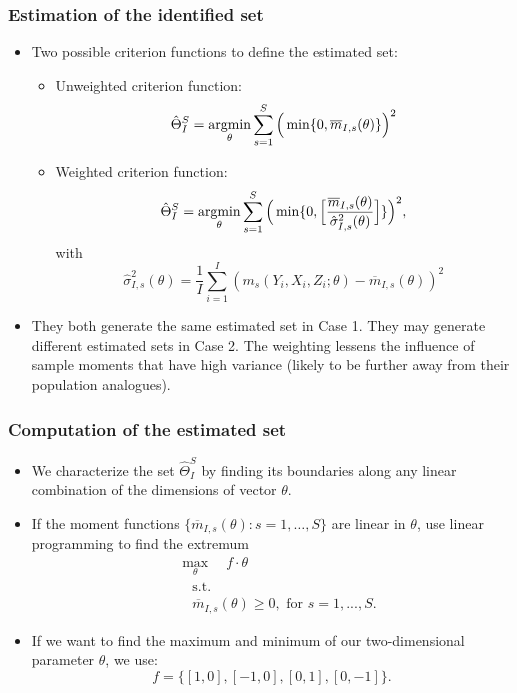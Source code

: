 \documentclass[10pt,letterpaper]{beamer}
\newcommand{\argmin}{\operatornamewithlimits{argmin}}
\begin{document}
\begin{frame}
\frametitle{Estimation of the identified set}

\begin{itemize}
	\item Two possible criterion functions to define the estimated set:
	\begin{itemize}
		\item Unweighted criterion function:
		\begin{equation*}
		\hat{\Theta}^{S}_{I} = \argmin_{\theta}\sum_{s=1}^{S}\Big(\min\{0,\overline{m}_{I,s}(\theta)\}\Big)^{2}
		\end{equation*}
		\item Weighted criterion function:
		\begin{equation*}
		\hat{\Theta}^{S}_{I} = \argmin_{\theta}\sum_{s=1}^{S}\Big(\min\{0,\Big[\frac{\overline{m}_{I,s}(\theta)}{\hat{\sigma}^{2}_{I,s}(\theta)}\Big]\}\Big)^{2},
		\end{equation*}
		with
		\begin{equation*}
		\hat{\sigma}^{2}_{I,s}(\theta)=\frac{1}{I}\sum_{i=1}^{I}(m_{s}(Y_{i},X_{i},Z_{i};\theta)-\overline{m}_{I,s}(\theta))^{2}
		\end{equation*}
	\end{itemize}
	\item They both generate the same estimated set in Case 1. They may generate different estimated sets in Case 2. The weighting lessens the influence of sample moments that have high variance (likely to be further away from their population analogues).
\end{itemize}
\end{frame}
\begin{frame}
\frametitle{Computation of the estimated set}

\begin{itemize}
	\item We characterize the set $\hat{\Theta}^{S}_{I}$ by finding its boundaries along any linear combination of the dimensions of vector $\theta$.
	 \item If the moment functions $\{\overline{m}_{I,s}(\theta ): s=1,\dots,S\}$ are linear in $\theta$, use linear programming to find the extremum 
	\begin{equation}
	\begin{split}
	& \max_{\theta}\quad f\cdot \theta \\
	& \quad \text{s.t.} \\
	& \quad \overline{m}_{I,s}(\theta )\geq 0,\text{ for }s=1,...,S.
	\label{eq: optvert}
	\end{split}
	\end{equation}
	\item If we want to find the maximum and minimum of our two-dimensional parameter $\theta$, we use:
	\begin{equation*}
	f=\{[1,0],[-1,0],[0,1],[0,-1]\}.
	\end{equation*}
\end{itemize}
\end{frame}
\end{document}
